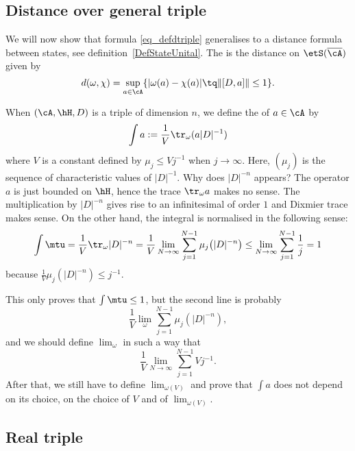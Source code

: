 \subsection{Distance over general triple}

We will now show that formula \eqref{eq_defdtriple} generalises to a distance formula between states, see definition~\ref{DefStateUnital}. The  is the distance on $\etS(\overline{ \cA })$ given by
\begin{equation}
	d(\omega,\chi)=\sup_{a\in\cA}\{ | \omega(a)-\chi(a) |\tq \| [D,a] \|\leq 1 \}.
\end{equation}

When $(\cA,\hH,D)$ is a triple of dimension $n$, we define the  of $a\in \cA$ by
\begin{equation}
	\int a:=\frac{1}{ V }\tr_{\omega}(a| D |^{-1})
\end{equation}
where $V$ is a constant defined by $\mu_j\leq V j^{-1}$ when $j\to\infty$. Here, $(\mu_j)$ is the sequence of characteristic values of $| D |^{-1}$. Why does $| D |^{-n}$ appears? The operator $a$ is just bounded on $\hH$, hence the trace $\tr_{\omega}a$ makes no sense. The multiplication by $| D |^{-n}$ gives rise to an infinitesimal of order $1$ and Dixmier trace makes sense. On the other hand, the integral is normalised in the following sense:
\[
	\int\mtu=\frac{1}{ V }\tr_{\omega}| D |^{-n}
	=\frac{1}{ V }\lim_{N\to\infty}\sum_{j=1}^{N-1}\mu_j\big( | D |^{-n} \big)
	\leq\lim_{N\to\infty}\sum_{j=1}^{N-1}\frac{1}{ j }
	=1
\]
because $\frac{1}{ V }\mu_j(| D |^{-n})\leq j^{-1}$.

\begin{probleme}
	This only proves that $\int\mtu\leq1$, but the second line is probably
	\[
		\frac{1}{ V }\lim_{\omega}\sum_{j=1}^{N-1}\mu_j(| D |^{-n}),
	\]
	and we should define $\lim_{\omega}$ in such a way that
	\[
		\frac{1}{ V }\lim_{N\to\infty}\sum_{j=1}^{N-1}Vj^{-1}.
	\]
	After that, we still have to define $\lim_{\omega(V)}$ and prove that $\int a$ does not depend on its choice, on the choice of $V$ and of $\lim_{\omega(V)}$.
\end{probleme}

\subsection{Real triple}

